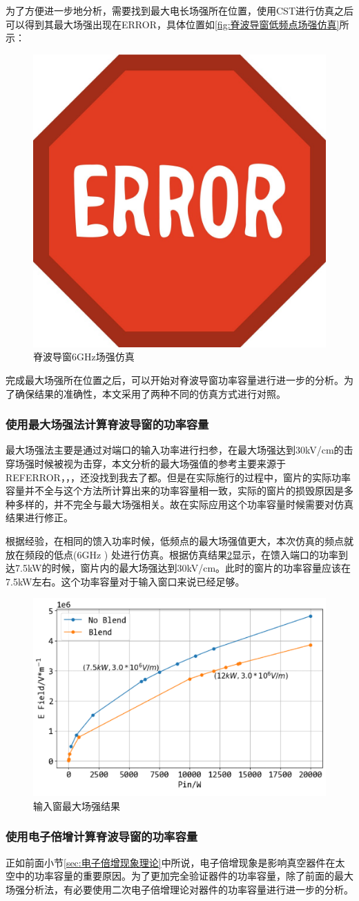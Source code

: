 \documentclass[master]{thesis-uestc}
\begin{document}
为了方便进一步地分析，需要找到最大电长场强所在位置，使用CST进行仿真之后可以得到其最大场强出现在ERROR，具体位置如\ref{fig:脊波导窗低频点场强仿真}所示：
\begin{figure}[!htb]
    \centering
    \includegraphics[width=0.2\linewidth]{pic/ERROR.jpg}
    \caption{脊波导窗6GHz场强仿真}
    \label{fig:脊波导窗6GHz场强仿真}
\end{figure}

完成最大场强所在位置之后，可以开始对脊波导窗功率容量进行进一步的分析。为了确保结果的准确性，本文采用了两种不同的仿真方式进行对照。
\subsubsection{使用最大场强法计算脊波导窗的功率容量}
最大场强法主要是通过对端口的输入功率进行扫参，在最大场强达到30kV/cm的击穿场强时候被视为击穿，本文分析的最大场强值的参考主要来源于REFERROR，，，还没找到我去了都。但是在实际施行的过程中，窗片的实际功率容量并不全与这个方法所计算出来的功率容量相一致，实际的窗片的损毁原因是多种多样的，并不完全与最大场强相关。故在实际应用这个功率容量时候需要对仿真结果进行修正。

根据经验，在相同的馈入功率时候，低频点的最大场强值更大，本次仿真的频点就放在频段的低点(6GHz ) 处进行仿真。根据仿真结果\ref{fig:输入窗最大场强结果}显示，在馈入端口的功率到达7.5kW的时候，窗片内的最大场强达到30kV/cm。此时的窗片的功率容量应该在7.5kW左右。这个功率容量对于输入窗口来说已经足够。
\begin{figure}[!htb]
    \centering
    \includegraphics[width=0.5\linewidth]{pic/chapter3/脊波导最大场强.png}
    \caption{输入窗最大场强结果}
    \label{fig:输入窗最大场强结果}
\end{figure}

\subsubsection{使用电子倍增计算脊波导窗的功率容量}
正如前面小节\ref{sec:电子倍增现象理论}中所说，电子倍增现象是影响真空器件在太空中的功率容量的重要原因。为了更加完全验证器件的功率容量，除了前面的最大场强分析法，有必要使用二次电子倍增理论对器件的功率容量进行进一步的分析。
\end{document}
